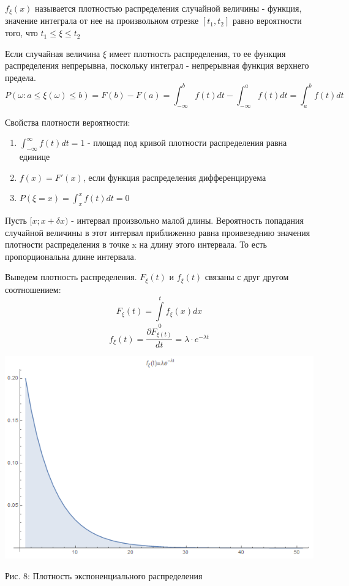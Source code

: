 \documentclass[aps,%
12pt,%
final,%
oneside,
onecolumn,%
musixtex, %
superscriptaddress,%
centertags]{article} %
\theoremstyle{plain}
\theoremstyle{definition}
\theoremstyle{remark}
\begin{document}
$f_{\xi}(x)$ называется плотностью распределения случайной величины - функция, значение интеграла от нее на произвольном отрезке $[t_1,t_2]$ равно вероятности того, что $t_1 \leq \xi \leq t_2$

Если случайная величина $\xi$ имеет плотность распределения, то ее функция распределения непрерывна, поскольку интеграл - непрерывная функция верхнего предела.
$$ P(\omega : a \leq \xi(\omega) \leq b) =  F(b) - F(a) = \int_{-\infty}^b f(t)dt - \int_{-\infty}^a f(t)dt = \int_{a}^b f(t)dt$$

Свойства плотности вероятности:

\begin{enumerate}
	\item $\int_{-\infty}^{\infty} f(t)dt = 1$ - площад под кривой плотности распределения равна единице
	\item $f(x) = F'(x)$, если функция распределения дифференцируема
	\item $P(\xi = x ) = \int_{x}^{x} f(t)dt = 0$
\end{enumerate}

Пусть $[x;x+\delta x)$ - интервал произвольно малой длины. Вероятность попадания случайной величины в этот интервал приближенно равна проивезеднию значения плотности распределения в точке x на длину этого интервала. То есть пропорциональна длине интервала.

Выведем плотность распределения. $F_{\xi}(t)$ и $f_{\xi}(t)$ связаны с друг другом соотношением:
$$F_{\xi}(t) = \int\limits_0^t f_{\xi}(x)dx$$
$$f_{\xi}(t) = \frac{\partial F_{\xi (t)}}{dt} = \lambda \cdot e^{-\lambda t}$$

\begin{center}
  \includegraphics[scale=0.6]{images/8.png}

  Рис. 8: Плотность экспоненциального распределения
\end{center}
\end{document}
